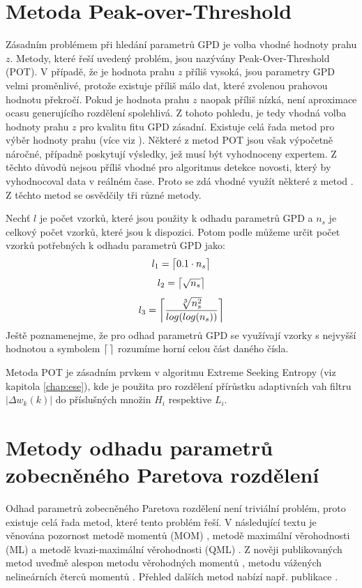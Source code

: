 \section{Metoda Peak-over-Threshold}
Zásadním problémem při hledání parametrů GPD je volba vhodné hodnoty prahu $z$. Metody, které řeší uvedený problém, jsou nazývány Peak-Over-Threshold (POT). V případě, že je hodnota prahu $z$ příliš vysoká, jsou parametry GPD velmi proměnlivé, protože existuje příliš málo dat, které zvolenou prahovou hodnotu překročí. Pokud je hodnota prahu $z$ naopak příliš nízká, není aproximace ocasu generujícího rozdělení spolehlivá.  Z tohoto pohledu, je tedy vhodná volba hodnoty prahu $z$ pro kvalitu fitu GPD zásadní. Existuje celá řada metod pro výběr hodnoty prahu (více viz \cite{scarrott2012review}). Některé z metod POT jsou však výpočetně náročné, případně poskytují výsledky, jež musí být vyhodnoceny expertem. Z těchto důvodů nejsou příliš vhodné pro algoritmus detekce novosti, který by vyhodnocoval data v reálném čase. Proto se zdá vhodné využít některé z metod . Z těchto metod se osvědčily tři různé metody.
\par 
Nechť $l$ je počet vzorků, které jsou použity k odhadu parametrů GPD a $n_s$ je celkový počet vzorků, které jsou k dispozici. Potom podle \cite{DuMouchel,ferreira2003optimising,loretan1994testing} můžeme určit počet vzorků potřebných k odhadu parametrů GPD jako:
\begin{equation} \label{eq:l1}
    l_1=\ceil[\big]{0.1 \cdot n_s}
\end{equation}
\begin{equation} \label{eq:l2}
    l_2=\ceil[\big]{\sqrt{n_s}}
\end{equation}
\begin{equation} \label{eq:l3}
     l_3=\ceil[\bigg]{\frac{\sqrt[3]{n_s^{2}}}{log(log(n_s))}}
\end{equation}
Ještě poznamenejme, že pro odhad parametrů GPD se využívají vzorky s nejvyšší  hodnotou a symbolem $\ceil{\, }$ rozumíme horní celou část daného čísla.
\par
Metoda POT je zásadním prvkem v algoritmu Extreme Seeking Entropy (viz kapitola \ref{chap:ese}), kde je použita pro rozdělení přírůstku adaptivních vah filtru $|\Delta w_k(k)|$ do příslušných množin $H_i$ respektive $L_i$.


\section{Metody odhadu parametrů zobecněného Paretova rozdělení}
Odhad parametrů zobecněného Paretova rozdělení není triviální problém, proto existuje celá řada metod, které tento problém řeší. V následující textu je věnována pozornost metodě momentů (MOM) \cite{mom_orig}, metodě maximální věrohodnosti (ML) \cite{DuMouchel} a metodě kvazi-maximální věrohodnosti (QML) \cite{Luceno}. Z nověji publikovaných metod uveďmě alespon metodu věrohodných momentů \cite{zhang1}, metodu vážených nelineárních čterců momentů \cite{zhao,park}. Přehled dalších metod nabízí např. publikace \cite{gpd_est}.
